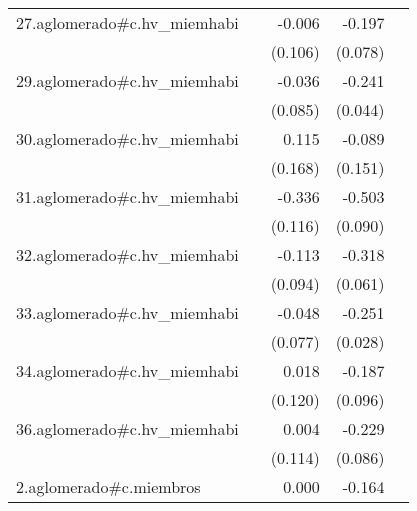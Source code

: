 {\begin{longtable}{l*{4}{D{.}{.}{-1}}}
\addlinespace
27.aglomerado#c.hv\_miemhabi&                     &      -0.006         &      -0.197\sym{*}  &                     \\
            &                     &     (0.106)         &     (0.078)         &                     \\
\addlinespace
29.aglomerado#c.hv\_miemhabi&                     &      -0.036         &      -0.241\sym{***}&                     \\
            &                     &     (0.085)         &     (0.044)         &                     \\
\addlinespace
30.aglomerado#c.hv\_miemhabi&                     &       0.115         &      -0.089         &                     \\
            &                     &     (0.168)         &     (0.151)         &                     \\
\addlinespace
31.aglomerado#c.hv\_miemhabi&                     &      -0.336\sym{**} &      -0.503\sym{***}&                     \\
            &                     &     (0.116)         &     (0.090)         &                     \\
\addlinespace
32.aglomerado#c.hv\_miemhabi&                     &      -0.113         &      -0.318\sym{***}&                     \\
            &                     &     (0.094)         &     (0.061)         &                     \\
\addlinespace
33.aglomerado#c.hv\_miemhabi&                     &      -0.048         &      -0.251\sym{***}&                     \\
            &                     &     (0.077)         &     (0.028)         &                     \\
\addlinespace
34.aglomerado#c.hv\_miemhabi&                     &       0.018         &      -0.187         &                     \\
            &                     &     (0.120)         &     (0.096)         &                     \\
\addlinespace
36.aglomerado#c.hv\_miemhabi&                     &       0.004         &      -0.229\sym{**} &                     \\
            &                     &     (0.114)         &     (0.086)         &                     \\
\addlinespace
2.aglomerado#c.miembros&                     &       0.000         &      -0.164\sym{***}&                     \\

\end{longtable}}
